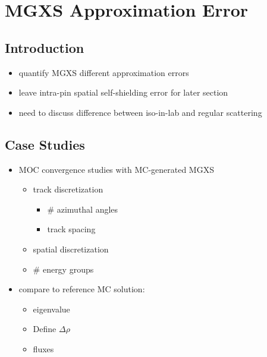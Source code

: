 \chapter{MGXS Approximation Error}
\label{chap:mgxs-approx-error}

\section{Introduction}
\label{sec:chap4-intro}

\begin{itemize}
  \item quantify \ac{MGXS} different approximation errors
  \item leave intra-pin spatial self-shielding error for later section
  \item need to discuss difference between iso-in-lab and regular scattering
\end{itemize}


\section{Case Studies}
\label{sec:chap4-case-studies}

\begin{itemize}
  \item \ac{MOC} convergence studies with \ac{MC}-generated \ac{MGXS}
  \begin{itemize}
    \item track discretization
    \begin{itemize}
      \item \# azimuthal angles
      \item track spacing
    \end{itemize}
    \item spatial discretization
    \item \# energy groups  
  \end{itemize}
  \item compare to reference \ac{MC} solution:
  \begin{itemize}
    \item eigenvalue
	\item Define $\Delta\rho$
    \item fluxes
  \end{itemize}
\end{itemize}

